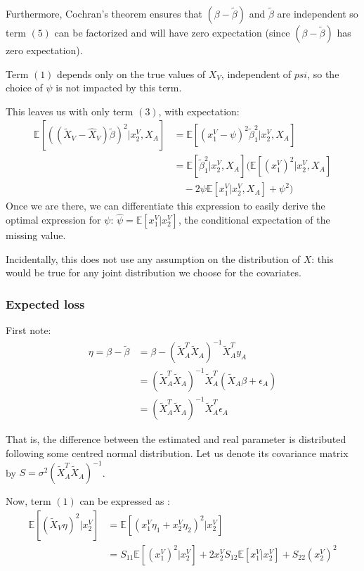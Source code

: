 Furthermore, Cochran's theorem ensures that $(\beta - \tilde{\beta})$ and $\tilde{\beta}$ are independent so term $(5)$ can be factorized and will have zero expectation (since $(\beta - \tilde{\beta})$ has zero expectation).

Term $(1)$ depends only on the true values of $X_V$, independent of $psi$, so the choice of $\psi$  is not impacted by this term.

This leaves us with only term $(3)$, with expectation:
\begin{align*}
\mathbb{E}[((\tilde{X}_V-\hat{X}_V)\tilde{\beta})^2 \vert x^V_2, X_A] &= \mathbb{E}[(x_1^V - \psi)^2 \tilde{\beta}_1^2 \vert x^V_2, X_A] \\
													&= \mathbb{E}[\tilde{\beta}_1^2 \vert x^V_2, X_A] (\mathbb{E}[(x_1^V)^2\vert x^V_2, X_A] \\
													& \quad - 2\psi \mathbb{E}[x_1^V\vert x^V_2, X_A] + \psi^2)
\end{align*}
Once we are there, we can differentiate this expression to easily derive the optimal expression for $\psi$: $\hat{\psi} = \mathbb{E}[x_1^V\vert x^V_2]$, the conditional expectation of the missing value.

Incidentally, this does not use any assumption on the distribution of $X$: this would be true for any joint distribution we choose for the covariates.

			\subsubsection{Expected loss}
First note:
\begin{align*}
\eta = \beta - \tilde{\beta} &= \beta - (\tilde{X}_A^T \tilde{X}_A)^{-1} \tilde{X}_A^T y_A \\
		&= (\tilde{X}_A^T \tilde{X}_A)^{-1} \tilde{X}_A^T (\tilde{X}_A \beta + \epsilon_A) \\
		&= (\tilde{X}_A^T \tilde{X}_A)^{-1} \tilde{X}_A^T \epsilon_A
\end{align*}

That is, the difference between the estimated and real parameter is distributed following some centred normal distribution. Let us denote its covariance matrix by $S = \sigma^2 (\tilde{X}_A^T \tilde{X}_A)^{-1} $.

Now, term $(1)$ can be expressed as :
\begin{align*}
\mathbb{E}[(\tilde{X}_V \eta)^2 \vert x^V_2] &= \mathbb{E}[(x^V_1 \eta_1 + x^V_2 \eta_2)^2\vert x^V_2] \\
											&= S_{11} \mathbb{E}[(x^V_1)^2 \vert x^V_2]  + 2x^V_2 S_{12} \mathbb{E}[x^V_1 \vert x^V_2] + S_{22} (x^V_2)^2
\end{align*}

